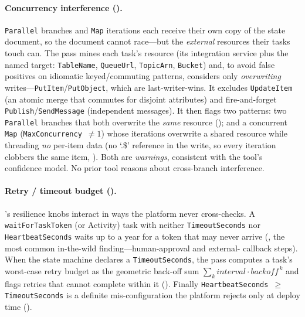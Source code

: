 \paragraph{Concurrency interference ().}
\texttt{Parallel} branches and \texttt{Map} iterations each receive their own copy of
the state document, so the document cannot race---but the \emph{external} resources
their tasks touch can. The pass mines each task's resource (its integration service plus
the named target: \texttt{TableName}, \texttt{QueueUrl}, \texttt{TopicArn},
\texttt{Bucket}) and, to avoid false positives on idiomatic keyed/commuting patterns,
considers only \emph{overwriting} writes---\texttt{PutItem}/\texttt{PutObject}, which are
last-writer-wins. It excludes \texttt{UpdateItem} (an atomic merge that commutes for
disjoint attributes) and fire-and-forget \texttt{Publish}/\texttt{SendMessage}
(independent messages). It then flags two patterns: two \texttt{Parallel} branches that
both overwrite the \emph{same} resource (); and a concurrent \texttt{Map}
(\texttt{MaxConcurrency}~$\neq 1$) whose iterations overwrite a shared resource while
threading \emph{no} per-item data (no `.\$' reference in the write, so every iteration
clobbers the same item, ). Both are \emph{warnings}, consistent with the
tool's confidence model. No prior \asl{} tool reasons about cross-branch interference.

\paragraph{Retry / timeout budget ().}
\asl{}'s resilience knobs interact in ways the platform never cross-checks. A
\texttt{waitForTaskToken} (or Activity) task with neither \texttt{TimeoutSeconds} nor
\texttt{HeartbeatSeconds} waits up to a year for a token that may never arrive
(, the most common in-the-wild finding---human-approval and external-%
callback steps). When the state machine declares a \texttt{TimeoutSeconds}, the pass
computes a task's worst-case retry budget as the geometric back-off sum
$\sum_k \mathit{interval}\cdot\mathit{backoff}^{\,k}$ and flags retries that cannot
complete within it (). Finally \texttt{HeartbeatSeconds}~$\geq$~%
\texttt{TimeoutSeconds} is a definite mis-configuration the platform rejects only at
deploy time ().

